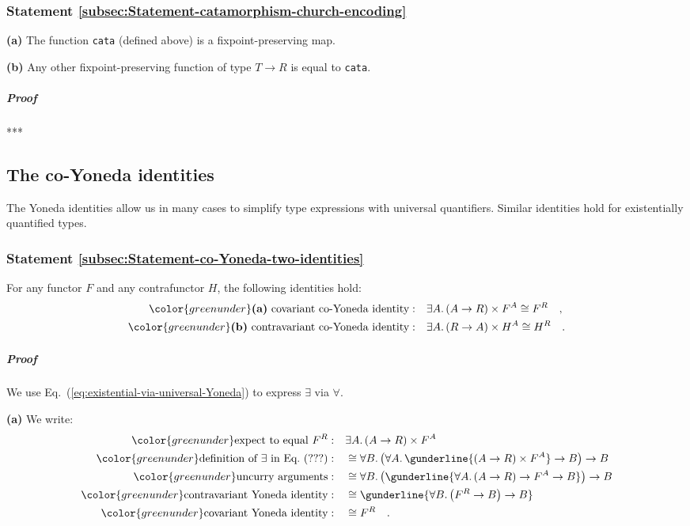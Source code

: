 \subsubsection{Statement \label{subsec:Statement-catamorphism-church-encoding}\ref{subsec:Statement-catamorphism-church-encoding}}

\textbf{(a)} The function \lstinline!cata!
(defined above) is a fixpoint-preserving map.

\textbf{(b)} Any other fixpoint-preserving function of type $T\rightarrow R$
is equal to \lstinline!cata!.

\subparagraph{Proof}

{*}{*}{*}

\subsection{The co-Yoneda identities}

The Yoneda identities allow us in many cases to simplify type expressions
with universal quantifiers. Similar identities hold for existentially
quantified types. 

\subsubsection{Statement \label{subsec:Statement-co-Yoneda-two-identities}\ref{subsec:Statement-co-Yoneda-two-identities}}

For any functor $F$ and any contrafunctor $H$, the following identities
hold:
\begin{align*}
{\color{greenunder}\text{\textbf{(a)} }\text{covariant co-Yoneda identity}:}\quad & \exists A.\,(A\rightarrow R)\times F^{A}\cong F^{R}\quad,\\
{\color{greenunder}\text{\textbf{(b)} }\text{contravariant co-Yoneda identity}:}\quad & \exists A.\,(R\rightarrow A)\times H^{A}\cong H^{R}\quad.
\end{align*}


\subparagraph{Proof}

We use Eq.~(\ref{eq:existential-via-universal-Yoneda}) to express
$\exists$ via $\forall$. 

\textbf{(a)} We write:
\begin{align*}
{\color{greenunder}\text{expect to equal }F^{R}:}\quad & \exists A.\,(A\rightarrow R)\times F^{A}\\
{\color{greenunder}\text{definition of }\exists\text{ in Eq.~}(???):}\quad & \cong\forall B.\,\big(\forall A.\,\gunderline{(A\rightarrow R)\times F^{A}}\rightarrow B\big)\rightarrow B\\
{\color{greenunder}\text{uncurry arguments}:}\quad & \cong\forall B.\,\big(\gunderline{\forall A.\,(A\rightarrow R)\rightarrow F^{A}\rightarrow B}\big)\rightarrow B\\
{\color{greenunder}\text{contravariant Yoneda identity}:}\quad & \cong\gunderline{\forall B.\,\big(F^{R}\rightarrow B\big)\rightarrow B}\\
{\color{greenunder}\text{covariant Yoneda identity}:}\quad & \cong F^{R}\quad.
\end{align*}

